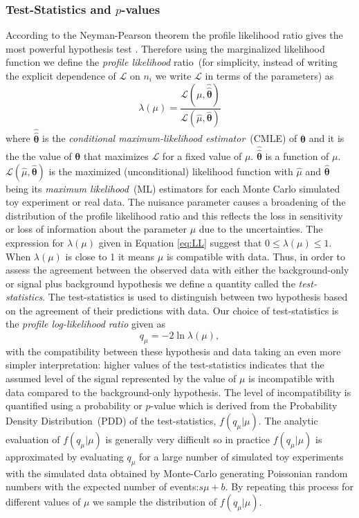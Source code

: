 \subsubsection{Test-Statistics and $p$-values} 
According to the Neyman-Pearson theorem the profile likelihood ratio gives the most powerful hypothesis test \cite{NPT}. Therefore using the marginalized likelihood function we define the \textit{profile likelihood} ratio~(for simplicity, instead of writing the explicit dependence of $\mathcal{L}$ on $n_{i}$ we write  $\mathcal{L}$ in terms of the parameters) as
\begin{equation}\label{eq:PLL}
\lambda(\mu) =  \frac{\mathcal{L}(\mu, \hat{\hat{\mathbf{\theta}}})}{\mathcal{L}(\hat{\mu}, \hat{\mathbf{\theta}} )}
\end{equation}
where $\hat{\hat{\mathbf{\theta}}}$ is the \textit{conditional maximum-likelihood estimator}~(CMLE) of $\mathbf{\theta}$ and it is the the value of $\mathbf{\theta}$ that maximizes $\mathcal{L}$ for a fixed value of $\mu$. $\hat{\hat{\mathbf{\theta}}}$ is a function of $\mu$.  $\mathcal{L}(\hat{\mu}, \hat{\mathbf{\theta}} )$ is the maximized (unconditional) likelihood function with $\hat{\mu}$ and $\hat{\mathbf{\theta}}$ being its \textit{maximum likelihood}~(ML) estimators for each Monte Carlo simulated toy experiment or real data. 
\newline
The nuisance parameter causes a broadening of the distribution of the profile likelihood ratio and this reflects the loss in sensitivity or loss of information about the parameter $\mu$ due to the uncertainties.%
\newline
The expression for $\lambda(\mu)$ given in Equation \ref{eq:LL} suggest that $0 \leq \lambda(\mu) \leq 1$. When $\lambda(\mu)$ is close to 1 it means $\mu$ is compatible with data. Thus, in order to assess the agreement between the observed data with either the background-only or signal plus background hypothesis we define a quantity called the \textit{test-statistics}. The test-statistics is used to distinguish between two hypothesis based on the agreement of their predictions with data. Our choice of test-statistics is the \textit{profile log-likelihood ratio} given as
\begin{equation}
 q_{\mu} = -2\ln \lambda(\mu),
\end{equation}
with the compatibility between these hypothesis and data taking an even more simpler interpretation: higher values of the test-statistics indicates that the assumed level of the signal represented by the value of $\mu$ is incompatible with data compared to the background-only hypothesis. The level of incompatibility is quantified using a probability or $p$-value which is derived from the Probability Density Distribution~(PDD) of the test-statistics, $f(q_{\mu}|\mu)$. The analytic evaluation of $f(q_{\mu}|\mu)$ is generally very difficult so in practice $f(q_{\mu}|\mu)$ is approximated by evaluating $q_{\mu}$ for a large number of simulated toy experiments with the simulated data obtained by Monte-Carlo generating Poissonian random numbers with the expected number of events:$s\mu + b$. By repeating this process for different values of $\mu$ we sample the distribution of $f(q_{\mu}|\mu)$.
